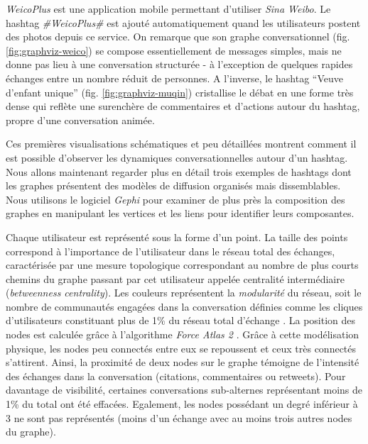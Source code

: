 \textit{WeicoPlus} est une application mobile permettant d{\textquoteright}utiliser \textit{Sina Weibo}. Le hashtag \textit{\#WeicoPlus\#} est ajouté automatiquement quand les utilisateurs postent des photos depuis ce service. On remarque que son graphe conversationnel (fig. \ref{fig:graphviz-weico})  se compose essentiellement de messages simples, mais ne donne pas lieu à une conversation structurée - à l{\textquoteright}exception de quelques rapides échanges entre un nombre réduit de personnes. A l{\textquoteright}inverse, le hashtag {\textquotedblleft}Veuve d{\textquoteright}enfant unique{\textquotedblright}  (fig. \ref{fig:graphviz-muqin}) cristallise le débat en une forme très dense qui reflète une surenchère de commentaires et d{\textquoteright}actions autour du hashtag, propre d{\textquoteright}une conversation animée.

Ces premières visualisations schématiques et peu détaillées montrent comment il est possible d'observer les dynamiques conversationnelles autour d'un hashtag. Nous allons maintenant regarder plus en détail trois exemples de hashtags dont les graphes présentent des modèles de diffusion organisés mais dissemblables. Nous utilisons le logiciel \textit{Gephi} \citep{Bastian2009} pour examiner de plus près la composition des graphes en manipulant les vertices et les liens pour identifier leurs composantes.

Chaque utilisateur est représenté sous la forme d{\textquoteright}un point. La taille des points correspond à l{\textquoteright}importance de l{\textquoteright}utilisateur dans le réseau total des échanges, caractérisée par une mesure topologique correspondant au nombre de plus courts chemins du graphe passant par cet utilisateur appelée centralité intermédiaire (\textit{betweenness centrality}). Les couleurs représentent la \textit{modularité }du réseau, soit le nombre de communautés engagées dans la conversation définies comme les cliques d{\textquoteright}utilisateurs constituant plus de 1\% du réseau total d{\textquoteright}échange \citep{Blondel2008}. La position des nodes est calculée gr\^ace à l{\textquoteright}algorithme \textit{Force Atlas 2} \citep{Bastian2009}. Grâce à cette modélisation physique, les nodes peu connectés entre eux se repoussent et ceux très connectés s{\textquoteright}attirent. Ainsi, la proximité de deux nodes sur le graphe témoigne de l'intensité des échanges dans la conversation (citations, commentaires ou retweets). Pour davantage de visibilité, certaines conversations sub-alternes représentant moins de 1\% du total ont été effacées. Egalement, les nodes possédant un degré inférieur à 3 ne sont pas représentés (moins d{\textquoteright}un échange avec au moins trois autres nodes du graphe).

